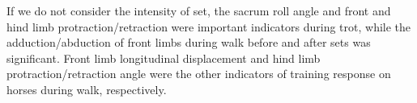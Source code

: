 If we do not consider the intensity of \gls{set}, the sacrum roll angle and front and hind limb protraction/retraction were important indicators during trot, while the adduction/abduction of front limbs during walk before and after \gls{set}s was significant. Front limb longitudinal displacement and hind limb protraction/retraction angle were the other indicators of training response on horses during walk, respectively. 


